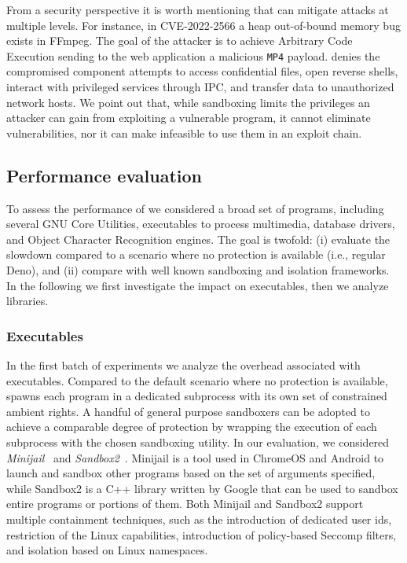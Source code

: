 From a security perspective it is worth mentioning that \pap can
mitigate attacks at multiple levels. For instance, in CVE-2022-2566 a
heap out-of-bound memory bug exists in FFmpeg. The goal of the
attacker is to achieve Arbitrary Code Execution sending to the web
application a malicious {\tt MP4} payload. \pap denies the compromised
component attempts to access confidential files, open reverse shells,
interact with privileged services through IPC, and transfer data to
unauthorized network hosts. We point out that, while sandboxing limits
the privileges an attacker can gain from exploiting a vulnerable
program, it cannot eliminate vulnerabilities, nor it can
make infeasible to use them in an exploit chain.


\subsection{Performance evaluation}
\label{subsect:performance-eval}

To assess the performance of \pap we considered a broad set of
programs, including several GNU Core Utilities, executables to process
multimedia, database drivers, and Object Character Recognition
engines. The goal is twofold: (i) evaluate the slowdown compared to a
scenario where no protection is available (i.e., regular Deno), and
(ii) compare \pap with well known sandboxing and isolation frameworks.
In the following we first investigate the impact on executables, then
we analyze libraries.

\subsubsection{Executables}

In the first batch of experiments we analyze the overhead associated
with executables. Compared to the default scenario where no protection
is available, \pap spawns each program in a dedicated subprocess with
its own set of constrained ambient rights. A handful of
general purpose sandboxers can be adopted to achieve a comparable
degree of protection by wrapping the execution of each subprocess with the chosen sandboxing utility. In our evaluation, we considered {\em
  Minijail}~\cite{minijail} and {\em Sandbox2}~\cite{sandbox2}.
Minijail is a tool used in ChromeOS and Android to launch and sandbox
other programs based on the set of arguments specified, while Sandbox2
is a C++ library written by Google that can be used to sandbox entire
programs or portions of them. Both Minijail and Sandbox2 support
multiple containment techniques, such as the introduction of dedicated
user ids, restriction of the Linux capabilities, introduction of
policy-based Seccomp filters, and isolation based on Linux namespaces.

